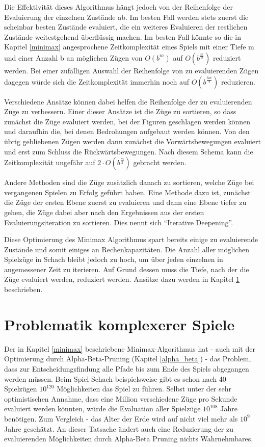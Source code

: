 Die Effektivität dieses Algorithmus hängt jedoch von der Reihenfolge der Evaluierung der einzelnen Zustände ab. Im besten Fall werden stets zuerst die scheinbar besten Zustände evaluiert, die ein weiteres Evaluieren der restlichen Zustände weitestgehend überflüssig machen. Im besten Fall könnte so die in Kapitel \ref{minimax} angesprochene Zeitkomplexität eines Spiels mit einer Tiefe m und einer Anzahl b an möglichen Zügen von $O(b^m)$ auf $O(b^\frac{m}{2})$ reduziert werden. Bei einer zufälligen Auswahl der Reihenfolge von zu evaluierenden Zügen dagegen würde sich die Zeitkomplexität immerhin noch auf $O(b^\frac{3m}{4})$ reduzieren. \cite{Russell2010}

Verschiedene Ansätze können dabei helfen die Reihenfolge der zu evaluierenden Züge zu verbessern. Einer dieser Ansätze ist die Züge zu sortieren, so dass zunächst die Züge evaluiert werden, bei der Figuren geschlagen werden können und daraufhin die, bei denen Bedrohungen aufgebaut werden können. Von den übrig gebliebenen Zügen werden dann zunächst die Vorwärtsbewegungen evaluiert und erst zum Schluss die Rückwärtsbewegungen. Nach diesem Schema kann die Zeitkomplexität ungefähr auf $2 \cdot O(b^\frac{m}{2})$ gebracht werden. \cite{Russell2010}

Andere Methoden sind die Züge zusätzlich danach zu sortieren, welche Züge bei vergangenen Spielen zu Erfolg geführt haben. Eine Methode dazu ist, zunächst die Züge der ersten Ebene zuerst zu evaluieren und dann eine Ebene tiefer zu gehen, die Züge dabei aber nach den Ergebnissen aus der ersten Evaluierungsiteration zu sortieren. Dies nennt sich ``Iterative Deepening''. \cite{Russell2010}

Diese Optimierung des Minimax Algorithmus spart bereits einige zu evaluierende Zustände und somit einiges an Rechenkapazitäten. Die Anzahl aller möglichen Spielzüge in Schach bleibt jedoch zu hoch, um über jeden einzelnen in angemessener Zeit zu iterieren. Auf Grund dessen muss die Tiefe, nach der die Züge evaluiert werden, reduziert werden. Ansätze dazu werden in Kapitel \ref{depth_limit} beschrieben.

\section{Problematik komplexerer Spiele}\label{depth_limit}

Der in Kapitel \ref{minimax} beschriebene Minimax-Algorithmus hat - auch mit der Optimierung durch Alpha-Beta-Pruning (Kapitel \ref{alpha_beta}) - das Problem, dass zur Entscheidungsfindung alle Pfade bis zum Ende des Spiels abgegangen werden müssen. Beim Spiel Schach beispielsweise gibt es schon nach 40 Spielzügen $10^{120}$ Möglichkeiten das Spiel zu führen. Selbst unter der sehr optimistischen Annahme, dass eine Million verschiedene Züge pro Sekunde evaluiert werden könnten, würde die Evaluation aller Spielzüge $10^{108}$ Jahre benötigen. \cite{Bernstein1958} Zum Vergleich - das Alter der Erde wird auf nicht viel mehr als $10^{9}$ Jahre geschätzt. \cite{Braterman} An dieser Tatsache ändert auch eine Reduzierung der zu evaluierenden Möglichkeiten durch Alpha-Beta Pruning nichts Wahrnehmbares.

